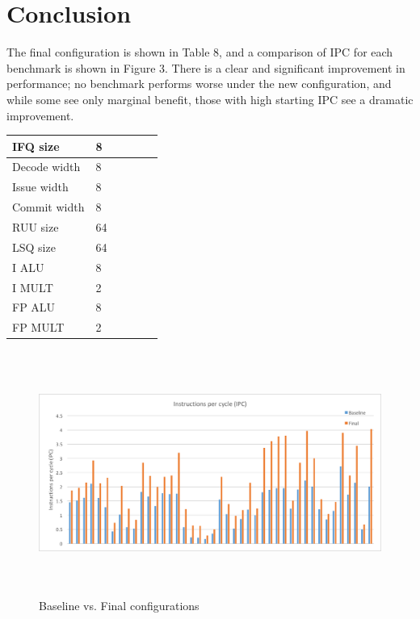 \documentclass[english]{article}
\begin{document}
\section{Conclusion}
The final configuration is shown in Table 8, and a comparison of IPC for each benchmark is shown in Figure 3. There is a clear and significant improvement in performance; no benchmark performs worse under the new configuration, and while some see only marginal benefit, those with high starting IPC see a dramatic improvement.

\begin{center}
    \singlespacing
	\vspace{.30cm}
	\begin{tabular}{ | l | l | l | l | l | l |}
	\hline
	  IFQ size & 8 \\ \hline
      Decode width & 8 \\ \hline
      Issue width & 8 \\ \hline
      Commit width & 8 \\ \hline
      RUU size & 64 \\ \hline
      LSQ size & 64 \\ \hline
      I ALU & 8 \\ \hline
      I MULT & 2 \\ \hline
      FP ALU & 8 \\ \hline
      FP MULT & 2 \\ \hline
	\end{tabular}
\end{center}

\begin{figure}[H]
	\centering
	\includegraphics[height=8cm]{final.png}
	\caption{Baseline vs. Final configurations}
\end{figure}
\end{document}
